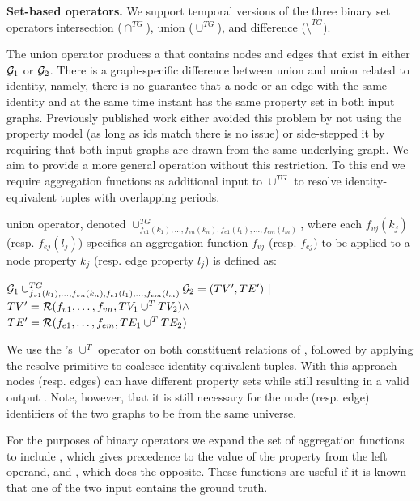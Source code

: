 {\bf Set-based operators.}  We support temporal versions of the three binary set operators
intersection ($\cap^{TG}$), union ($\cup^{TG}$), and difference
($\setminus^{TG}$).  

The union operator produces a \tg that contains nodes and edges that
exist in either $\mathcal{G}_1$ or $\mathcal{G}_2$.  There is a graph-specific
difference between \tra union and \tga union related to identity,
namely, there is no guarantee that a node or an edge with the same
identity and at the same time instant has the same property set in
both input graphs.  Previously published work either avoided this
problem by not using the property model (as long as ids match there is
no issue) or side-stepped it by requiring that both input graphs are
drawn from the same underlying graph.  We aim to provide a more
general operation without this restriction.  To this end we require
aggregation functions as additional input to $\cup^{TG}$ to resolve
identity-equivalent tuples with overlapping periods.

\begin{definition}[Union]
\label{def:uniontg}
\tg union operator, denoted $\cup^{TG}_{f_{v1}(k_1),\ldots,f_{vn}(k_n),f_{e1}(l_1),\ldots,f_{em}(l_m)}$,
where each $f_{vj}(k_j)$ (resp. $f_{ej}(l_j)$) specifies an aggregation
function $f_{vj}$ (resp. $f_{ej}$) to be applied to a node property
$k_j$ (resp. edge property $l_j$) is defined as:

$\mathcal{G}_1 \cup^{TG}_{f_{v1}(k_1),\ldots,f_{vn}(k_n),f_{e1}(l_1),\ldots,f_{em}(l_m)} \mathcal{G}_2 = (TV', TE') ~|~$\\$TV' = \mathcal{R}(f_{v1},\ldots,f_{vn},TV_1 \cup^T TV_2) \land$\\$TE' = \mathcal{R}(f_{e1},\ldots,f_{em},TE_1 \cup^T TE_2)$
\end{definition}

We use the \tra's $\cup^T$ operator on both constituent relations of
\ttt, followed by applying the resolve primitive to coalesce
identity-equivalent tuples.  With this approach nodes (resp. edges)
can have different property sets while still resulting in a valid
output \tg.  Note, however, that it is still necessary for the node
(resp. edge) identifiers of the two graphs to be from the same
universe.

For the purposes of binary operators we expand the set of aggregation
functions to include , which gives precedence to the value
of the property from the left operand, and , which does
the opposite.  These functions are useful if it is known that one of
the two input \tgs contains the ground truth.

